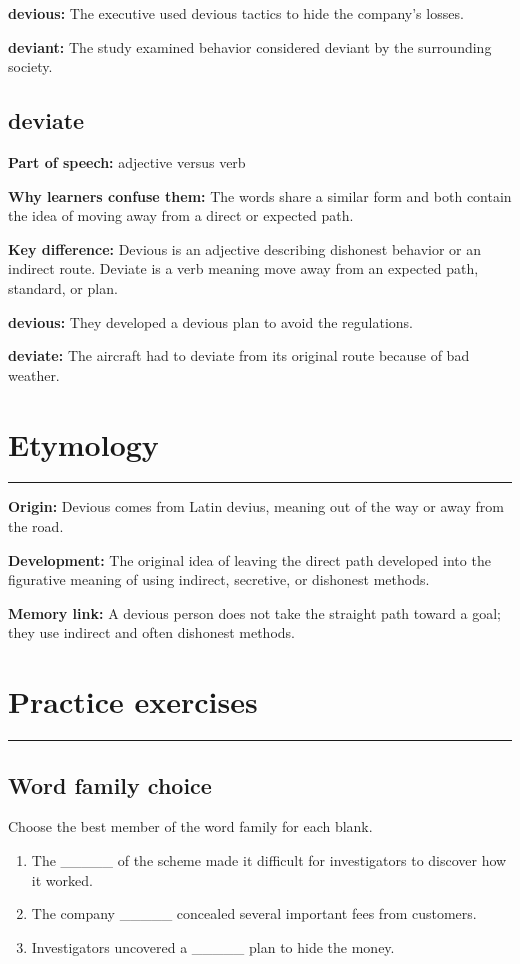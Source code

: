 \documentclass[11pt]{article}
\newcommand{\sectionrule}{\par\vspace{-0.5em}\noindent\textcolor{Accent}{\rule{\linewidth}{0.6pt}}\par}
\begin{document}
\textbf{devious:} The executive used devious tactics to hide the company's losses.

\textbf{deviant:} The study examined behavior considered deviant by the surrounding society.

\subsection{deviate}
\textbf{Part of speech:} adjective versus verb

\textbf{Why learners confuse them:} The words share a similar form and both contain the idea of moving away from a direct or expected path.

\textbf{Key difference:} Devious is an adjective describing dishonest behavior or an indirect route. Deviate is a verb meaning move away from an expected path, standard, or plan.

\textbf{devious:} They developed a devious plan to avoid the regulations.

\textbf{deviate:} The aircraft had to deviate from its original route because of bad weather.

\section{Etymology}
\sectionrule
\textbf{Origin:} Devious comes from Latin devius, meaning out of the way or away from the road.

\textbf{Development:} The original idea of leaving the direct path developed into the figurative meaning of using indirect, secretive, or dishonest methods.

\textbf{Memory link:} A devious person does not take the straight path toward a goal; they use indirect and often dishonest methods.

\section{Practice exercises}
\sectionrule
\subsection{Word family choice}
Choose the best member of the word family for each blank.

\begin{enumerate}
  \item The \_\_\_\_\_ of the scheme made it difficult for investigators to discover how it worked.
  \item The company \_\_\_\_\_ concealed several important fees from customers.
  \item Investigators uncovered a \_\_\_\_\_ plan to hide the money.
\end{enumerate}
\end{document}

